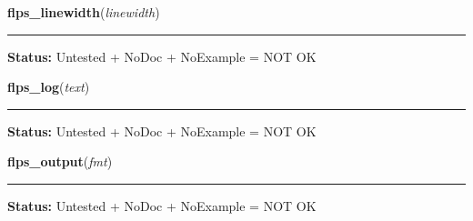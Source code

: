     \label{xformslib:library:flps_linewidth}

    \vspace{0.5ex}

\hspace{.8\funcindent}\begin{boxedminipage}{\funcwidth}

    \raggedright \textbf{flps\_linewidth}(\textit{linewidth})

    \vspace{-1.5ex}

    \rule{\textwidth}{0.5\fboxrule}
\setlength{\parskip}{2ex}
\setlength{\parskip}{1ex}
\textbf{Status:} Untested + NoDoc + NoExample = NOT OK



    \end{boxedminipage}

    \label{xformslib:library:flps_log}

    \vspace{0.5ex}

\hspace{.8\funcindent}\begin{boxedminipage}{\funcwidth}

    \raggedright \textbf{flps\_log}(\textit{text})

    \vspace{-1.5ex}

    \rule{\textwidth}{0.5\fboxrule}
\setlength{\parskip}{2ex}
\setlength{\parskip}{1ex}
\textbf{Status:} Untested + NoDoc + NoExample = NOT OK



    \end{boxedminipage}

    \label{xformslib:library:flps_output}

    \vspace{0.5ex}

\hspace{.8\funcindent}\begin{boxedminipage}{\funcwidth}

    \raggedright \textbf{flps\_output}(\textit{fmt})

    \vspace{-1.5ex}

    \rule{\textwidth}{0.5\fboxrule}
\setlength{\parskip}{2ex}
\setlength{\parskip}{1ex}
\textbf{Status:} Untested + NoDoc + NoExample = NOT OK



    \end{boxedminipage}

